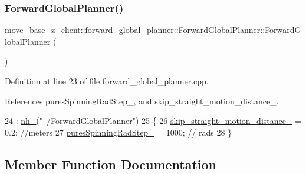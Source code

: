 \subsubsection{\texorpdfstring{Forward\+Global\+Planner()}{ForwardGlobalPlanner()}}
{\footnotesize\ttfamily move\+\_\+base\+\_\+z\+\_\+client\+::forward\+\_\+global\+\_\+planner\+::\+Forward\+Global\+Planner\+::\+Forward\+Global\+Planner (\begin{DoxyParamCaption}{ }\end{DoxyParamCaption})}



Definition at line 23 of file forward\+\_\+global\+\_\+planner.\+cpp.



References pures\+Spinning\+Rad\+Step\+\_\+, and skip\+\_\+straight\+\_\+motion\+\_\+distance\+\_\+.


\begin{DoxyCode}
24     : \hyperlink{classmove__base__z__client_1_1forward__global__planner_1_1ForwardGlobalPlanner_a3302fa193a6f9819514bd0990286b197}{nh\_}(\textcolor{stringliteral}{"~/ForwardGlobalPlanner"})
25 \{
26     \hyperlink{classmove__base__z__client_1_1forward__global__planner_1_1ForwardGlobalPlanner_ae33082b9dd81dd3ce8d3e68a6c032c61}{skip\_straight\_motion\_distance\_} = 0.2; \textcolor{comment}{//meters}
27     \hyperlink{classmove__base__z__client_1_1forward__global__planner_1_1ForwardGlobalPlanner_a91bac0160c7b6ea54f4188b60f7fcf89}{puresSpinningRadStep\_} = 1000;         \textcolor{comment}{// rads}
28 \}
\end{DoxyCode}


\subsection{Member Function Documentation}
\mbox{\label{classmove__base__z__client_1_1forward__global__planner_1_1ForwardGlobalPlanner_aed754f82f2907720ed1410bb00922bf4}} 
